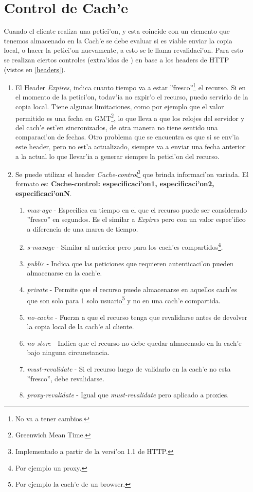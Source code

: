 \section{Control de Cach'e}
\label{controlCache}

Cuando el cliente realiza una petici'on, y esta coincide con un elemento que tenemos almacenado en la Cach'e se debe evaluar si es viable enviar la copia local, o hacer la petici'on nuevamente, a esto se le llama revalidaci'on. Para esto se realizan ciertos controles (extra'idos de \citep{cacheDef}) en base a los headers de HTTP (vistos en \ref{headers}).

\begin{enumerate}
\item El Header \textsl{Expires}, indica cuanto tiempo va a estar ''fresco''\footnote{No va a tener cambios.} el recurso. Si en el momento de la petici'on, todav'ia no expir'o el recurso, puedo servirlo de la copia local. Tiene algunas limitaciones, como por ejemplo que el valor permitido es una fecha en GMT\footnote{Greenwich Mean Time.}, lo que lleva a que los relojes del servidor y del cach'e est'en sincronizados, de otra manera no tiene sentido una comparaci'on de fechas. Otro problema que se encuentra es que si se env'ia este header, pero no est'a actualizado, siempre va a enviar una fecha anterior a la actual lo que llevar'ia a generar siempre la petici'on del recurso.
\item Se puede utilizar el header \textsl{Cache-control}\footnote{Implementado a partir de la versi'on 1.1 de HTTP.} que brinda informaci'on variada. El formato es: \textbf{Cache-control: especificaci'on1, especificaci'on2, especificaci'onN}.
	\begin{enumerate}
	\item \textsl{max-age} - Especifica en tiempo en el que el recurso puede ser considerado ''fresco'' en segundos. Es el similar a \textsl{Expires} pero con un valor espec'ifico a diferencia de una marca de tiempo.
	\item \textsl{s-maxage} - Similar al anterior pero para los cach'es compartidos\footnote{Por ejemplo un proxy.}.
	\item \textsl{public} - Indica que las peticiones que requieren autenticaci'on pueden almacenarse en la cach'e.
	\item \textsl{private} - Permite que el recurso puede almacenarse en aquellos cach'es que son solo para 1 solo usuario\footnote{Por ejemplo la cach'e de un browser.} y no en una cach'e compartida.
	\item \textsl{no-cache} - Fuerza a que el recurso tenga que revalidarse antes de devolver la copia local de la cach'e al cliente.
	\item \textsl{no-store} - Indica que el recurso no debe quedar almacenado en la cach'e bajo ninguna circunstancia.
	\item \textsl{must-revalidate} - Si el recurso luego de validarlo en la cach'e no esta ''fresco'', debe revalidarse.
	\item \textsl{proxy-revalidate} - Igual que \textsl{must-revalidate} pero aplicado a proxies.
	\end{enumerate}
\end{enumerate}

